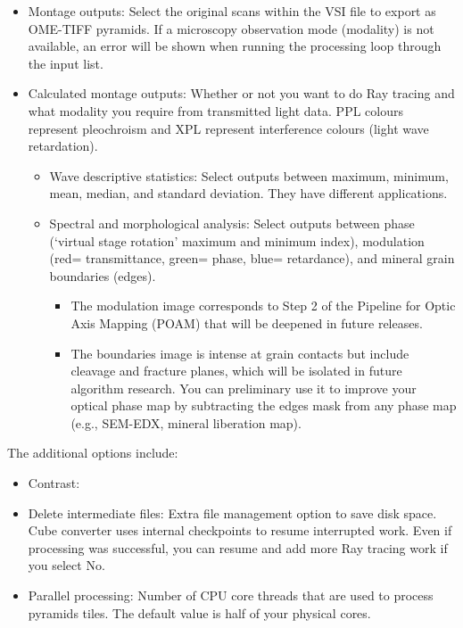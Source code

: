 	\begin{itemize}		
		\item Montage outputs: Select the original scans within the VSI file to export as OME-TIFF pyramids. If a microscopy observation mode (modality) is not available, an error will be shown when running the processing loop through the input list.
		\item Calculated montage outputs: Whether or not you want to do Ray tracing and what modality you require from transmitted light data. PPL colours represent pleochroism and XPL represent interference colours (light wave retardation). 
			\begin{itemize}
				\item Wave descriptive statistics: Select outputs between maximum, minimum, mean, median, and standard deviation. They have different applications.
				\item Spectral and morphological analysis: Select outputs between phase (`virtual stage rotation' maximum and minimum index), modulation (red= transmittance, green= phase, blue= retardance), and mineral grain boundaries (edges). 
					\begin{itemize}
						\item The modulation image corresponds to Step 2 of the Pipeline for Optic Axis Mapping (POAM) that will be deepened in future releases. 
						\item The boundaries image is intense at grain contacts but include cleavage and fracture planes, which will be isolated in future algorithm research. You can preliminary use it to improve your optical phase map by subtracting the edges mask from any phase map (e.g., SEM-EDX, mineral liberation map).
					\end{itemize}
			\end{itemize}
	\end{itemize}
	
	The additional options include:
		\begin{itemize}
			\item Contrast: 
			\item Delete intermediate files: Extra file management option to save disk space. Cube converter uses internal checkpoints to resume interrupted work. Even if processing was successful, you can resume and add more Ray tracing work if you select No. 
			\item Parallel processing: Number of CPU core threads that are used to process pyramids tiles. The default value is half of your physical cores.			
		\end{itemize}	
	
